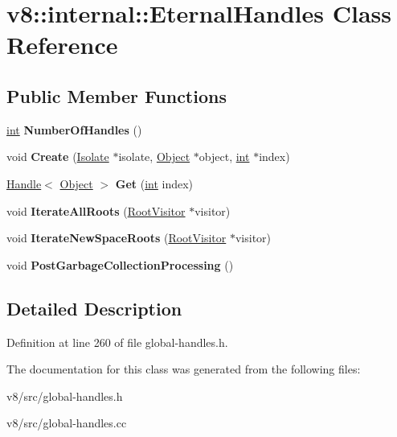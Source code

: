 \hypertarget{classv8_1_1internal_1_1EternalHandles}{}\section{v8\+:\+:internal\+:\+:Eternal\+Handles Class Reference}
\label{classv8_1_1internal_1_1EternalHandles}
\subsection*{Public Member Functions}
\begin{DoxyCompactItemize}
\item 
\mbox{\label{classv8_1_1internal_1_1EternalHandles_a2831b3a300390e2cb714f4dc1909d46b}} 
\mbox{\hyperlink{classint}{int}} {\bfseries Number\+Of\+Handles} ()
\item 
\mbox{\label{classv8_1_1internal_1_1EternalHandles_acf384364f5e06b605be609f0323b6c9a}} 
void {\bfseries Create} (\mbox{\hyperlink{classv8_1_1internal_1_1Isolate}{Isolate}} $\ast$isolate, \mbox{\hyperlink{classv8_1_1internal_1_1Object}{Object}} $\ast$object, \mbox{\hyperlink{classint}{int}} $\ast$index)
\item 
\mbox{\label{classv8_1_1internal_1_1EternalHandles_a5ddad5d646481d8b7a3bd966ad44d2f7}} 
\mbox{\hyperlink{classv8_1_1internal_1_1Handle}{Handle}}$<$ \mbox{\hyperlink{classv8_1_1internal_1_1Object}{Object}} $>$ {\bfseries Get} (\mbox{\hyperlink{classint}{int}} index)
\item 
\mbox{\label{classv8_1_1internal_1_1EternalHandles_ae1a2f97ea6a4aab634bccb7b4f53cee9}} 
void {\bfseries Iterate\+All\+Roots} (\mbox{\hyperlink{classv8_1_1internal_1_1RootVisitor}{Root\+Visitor}} $\ast$visitor)
\item 
\mbox{\label{classv8_1_1internal_1_1EternalHandles_aba01f7a7956c89fef21b826fe06c73b1}} 
void {\bfseries Iterate\+New\+Space\+Roots} (\mbox{\hyperlink{classv8_1_1internal_1_1RootVisitor}{Root\+Visitor}} $\ast$visitor)
\item 
\mbox{\label{classv8_1_1internal_1_1EternalHandles_aeb152d868b0adbf579d6b30453a3961e}} 
void {\bfseries Post\+Garbage\+Collection\+Processing} ()
\end{DoxyCompactItemize}


\subsection{Detailed Description}


Definition at line 260 of file global-\/handles.\+h.



The documentation for this class was generated from the following files\+:\begin{DoxyCompactItemize}
\item 
v8/src/global-\/handles.\+h\item 
v8/src/global-\/handles.\+cc\end{DoxyCompactItemize}
